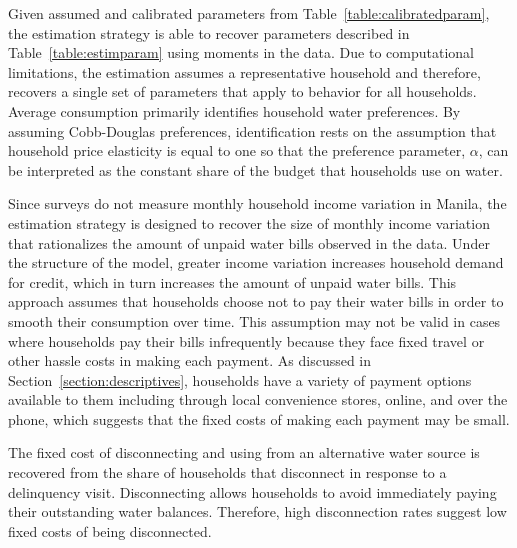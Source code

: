 \documentclass[12pt]{article}
\begin{document}
Given assumed and calibrated parameters from Table~\ref{table:calibratedparam}, the estimation strategy is able to recover parameters described in Table~\ref{table:estimparam} using moments in the data.  Due to computational limitations, the estimation assumes a representative household and therefore, recovers a single set of parameters that apply to behavior for all households.  Average consumption primarily identifies household water preferences.  By assuming Cobb-Douglas preferences, identification rests on the assumption that household price elasticity is equal to one so that the preference parameter, $\alpha$, can be interpreted as the constant share of the budget that households use on water.

Since surveys do not measure monthly household income variation in Manila, the estimation strategy is designed to recover the size of monthly income variation that rationalizes the amount of unpaid water bills observed in the data.  Under the structure of the model, greater income variation increases household demand for credit, which in turn increases the amount of unpaid water bills.  This approach assumes that households choose not to pay their water bills in order to smooth their consumption over time.  This assumption may not be valid in cases where households pay their bills infrequently because they face fixed travel or other hassle costs in making each payment.  As discussed in Section~\ref{section:descriptives}, households have a variety of payment options available to them including through local convenience stores, online, and over the phone, which suggests that the fixed costs of making each payment may be small. %

The fixed cost of disconnecting and using from an alternative water source is recovered from the share of households that disconnect in response to a delinquency visit.  Disconnecting allows households to avoid immediately paying their outstanding water balances.  Therefore, high disconnection rates suggest low fixed costs of being disconnected.
\end{document}
